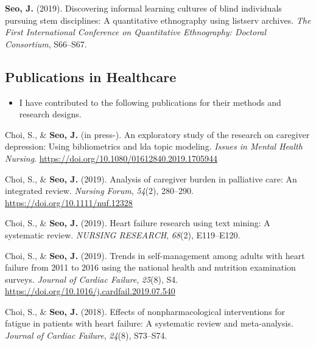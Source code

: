 \documentclass[11pt, a4paper]{awesome-cv}
\providecommand{\tightlist}{%
	\setlength{\itemsep}{0pt}\setlength{\parskip}{0pt}}
\begin{document}
\leavevmode\hypertarget{ref-seo2019discovering}{}%
\textbf{Seo, J.} (2019). Discovering informal learning cultures of blind individuals pursuing stem disciplines: A quantitative ethnography using listserv archives. \emph{The First International Conference on Quantitative Ethnography: Doctoral Consortium}, S66--S67.

\endgroup

\hypertarget{publications-in-healthcare}{%
\subsection{Publications in Healthcare}\label{publications-in-healthcare}}

\begin{itemize}
\tightlist
\item
  I have contributed to the following publications for their methods and research designs.
\end{itemize}

\begingroup
\setlength{\parindent}{-0.5in}
\setlength{\leftskip}{0.5in}

\hypertarget{refs_healthcare}{}
\leavevmode\hypertarget{ref-mentalhealth}{}%
Choi, S., \& \textbf{Seo, J.} (in press-). An exploratory study of the research on caregiver depression: Using bibliometrics and lda topic modeling. \emph{Issues in Mental Health Nursing}. \url{https://doi.org/10.1080/01612840.2019.1705944}

\leavevmode\hypertarget{ref-doi:10.1111ux2fnuf.12328}{}%
Choi, S., \& \textbf{Seo, J.} (2019). Analysis of caregiver burden in palliative care: An integrated review. \emph{Nursing Forum}, \emph{54}(2), 280--290. \url{https://doi.org/10.1111/nuf.12328}

\leavevmode\hypertarget{ref-choi2019heart}{}%
Choi, S., \& \textbf{Seo, J.} (2019). Heart failure research using text mining: A systematic review. \emph{NURSING RESEARCH}, \emph{68}(2), E119--E120.

\leavevmode\hypertarget{ref-choi2019trends}{}%
Choi, S., \& \textbf{Seo, J.} (2019). Trends in self-management among adults with heart failure from 2011 to 2016 using the national health and nutrition examination surveys. \emph{Journal of Cardiac Failure}, \emph{25}(8), S4. \url{https://doi.org/10.1016/j.cardfail.2019.07.540}

\leavevmode\hypertarget{ref-choi2018effects}{}%
Choi, S., \& \textbf{Seo, J.} (2018). Effects of nonpharmacological interventions for fatigue in patients with heart failure: A systematic review and meta-analysis. \emph{Journal of Cardiac Failure}, \emph{24}(8), S73--S74.
\end{document}
